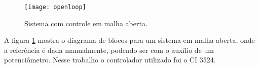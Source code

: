 \begin{figure}[H]
    \centering
    \caption{Sistema com controle em malha aberta.}
    \texttt{[image: openloop]}
    \label{fig:openloop}
\end{figure}

A figura \ref{fig:openloop} mostra o diagrama de blocos para um sistema em malha aberta, onde a referência é dada manualmente, podendo ser com o auxílio de um potenciômetro. Nesse trabalho o controlador utilizado foi o CI 3524.

